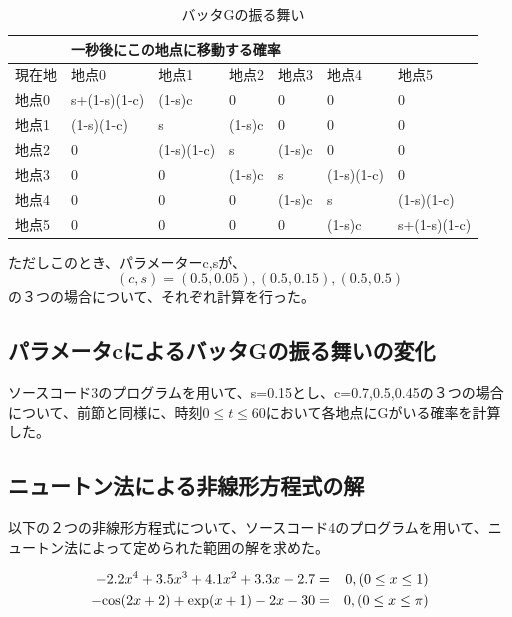\documentclass[11pt]{ltjsarticle}
\begin{document}
	\begin{table}[]
	\centering
	\begin{tabular}{|l|l|l|l|l|l|l|}
	\hline
    	& \multicolumn{6}{l|}{一秒後にこの地点に移動する確率}                                    \\ \hline
	現在地 & 地点0          & 地点1        & 地点2    & 地点3    & 地点4        & 地点5          \\ \hline
	地点0 & s+(1-s)(1-c) & (1-s)c     & 0      & 0      & 0          & 0            \\ \hline
	地点1 & (1-s)(1-c)   & s          & (1-s)c & 0      & 0          & 0            \\ \hline
	地点2 & 0            & (1-s)(1-c) & s      & (1-s)c & 0          & 0            \\ \hline
	地点3 & 0            & 0          & (1-s)c & s      & (1-s)(1-c) & 0            \\ \hline
	地点4 & 0            & 0          & 0      & (1-s)c & s          & (1-s)(1-c)   \\ \hline
	地点5 & 0            & 0          & 0      & 0      & (1-s)c     & s+(1-s)(1-c) \\ \hline
	\end{tabular}
	\caption{バッタGの振る舞い}
	\end{table}

	ただしこのとき、パラメーターc,sが、
	\[
		(c,s) = (0.5, 0.05), (0.5, 0.15), (0.5, 0.5)
	\]
	の３つの場合について、それぞれ計算を行った。

\subsection{パラメータcによるバッタGの振る舞いの変化}
	ソースコード3のプログラムを用いて、s=0.15とし、c=0.7,0.5,0.45の３つの場合について、前節と同様に、時刻$0 \leq t \leq 60$において各地点にGがいる確率を計算した。

\subsection{ニュートン法による非線形方程式の解}

以下の２つの非線形方程式について、ソースコード4のプログラムを用いて、ニュートン法によって定められた範囲の解を求めた。

\begin{eqnarray}
       - 2.2 x^4 + 3.5x^3 + 4.1x^2 + 3.3x - 2.7 & = & 0, (0 \leq x \leq 1) \\
       - {\rm cos}(2x+2) + {\rm exp}(x+1) - 2x -30 & = & 0, (0 \leq x \leq \pi)
\end{eqnarray}
\end{document}

